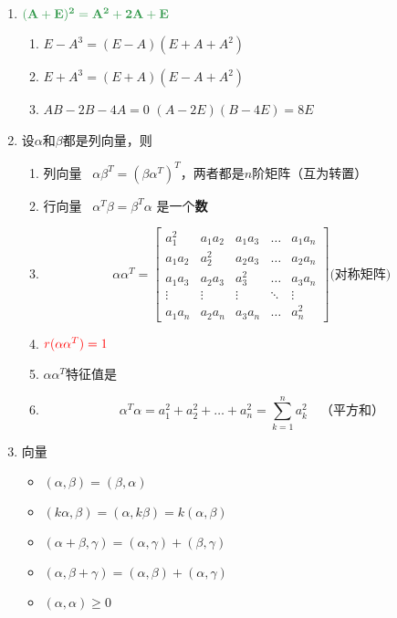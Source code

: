 \documentclass[a4paper,12pt]{article}
\begin{document}
\begin{enumerate}
        \item $\color[rgb]{0.2, 0.6, 0.3}{\mathbf{(A + E)^2 = A^2 + 2A + E}}$
        \begin{enumerate}
            \item $E - A^3 = (E - A)(E + A + A^2)$
            \item $E + A^3 = (E + A)(E - A + A^2)$
            \item $AB - 2B - 4A = 0$ \Leftrightarrow \; $(A - 2E)(B - 4E) = 8E$
        \end{enumerate}
        \item 设$\alpha$和$\beta$都是列向量，则
        \begin{enumerate}
            \item 列向量 \cdot {} \, $\alpha\beta^T = (\beta\alpha^T)^T$，两者都是$n$阶矩阵（互为转置）
            \item 行向量 \cdot {} \, $\alpha^T\beta = \beta^T\alpha$ 是一个\textbf{数}
            \item
            \[
                \alpha\alpha^T =
                \begin{bmatrix}
                    a_1^2   & a_1 a_2 & a_1 a_3 & \dots  & a_1 a_n \\
                    a_1 a_2 & a_2^2   & a_2 a_3 & \dots  & a_2 a_n \\
                    a_1 a_3 & a_2 a_3 & a_3^2   & \dots  & a_3 a_n \\
                    \vdots  & \vdots  & \vdots  & \ddots & \vdots  \\
                    a_1 a_n & a_2 a_n & a_3 a_n & \dots  & a_n^2
                \end{bmatrix} \text{(对称矩阵)}
            \]
            \item $\color{red}{r(\alpha\alpha^T) = 1}$
            \item $\alpha\alpha^T$特征值是{}
            \item
            \[
                \alpha^T \alpha = a_1^2 + a_2^2 + \dots + a_n^2 = \sum_{k=1}^{n} a_k^2 \quad \text{（平方和）}
            \]
        \end{enumerate}
        \item 向量
        \begin{itemize}
            \item $(\alpha, \beta) = (\beta, \alpha)$
            \item $(k\alpha, \beta) = (\alpha, k\beta) = k(\alpha, \beta)$
            \item $(\alpha + \beta, \gamma) = (\alpha, \gamma) + (\beta, \gamma)$
            \item $(\alpha, \beta + \gamma) = (\alpha, \beta) + (\alpha, \gamma)$
            \item $(\alpha, \alpha) \ge 0$
        \end{itemize}
    \end{enumerate}
\end{document}

